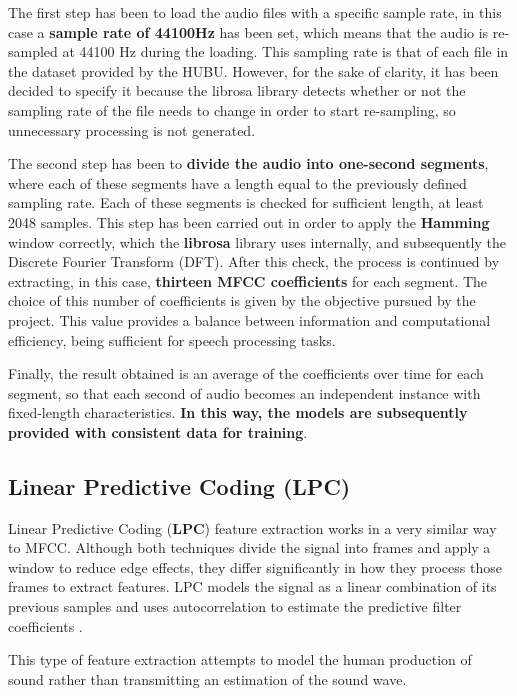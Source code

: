 The first step has been to load the audio files with a specific sample rate, in this case a \textbf{sample rate of 44100Hz} has been set, which means that the audio is re-sampled at 44100 Hz during the loading. This sampling rate is that of each file in the dataset provided by the HUBU. However, for the sake of clarity, it has been decided to specify it because the librosa library detects whether or not the sampling rate of the file needs to change in order to start re-sampling, so unnecessary processing is not generated. 

The second step has been to \textbf{divide the audio into one-second segments}, where each of these segments have a length equal to the previously defined sampling rate. Each of these segments is checked for sufficient length, at least 2048 samples. This step has been carried out in order to apply the \textbf{Hamming} window correctly, which the \textbf{librosa} library uses internally, and subsequently the Discrete Fourier Transform (DFT).  After this check, the process is continued by extracting, in this case, \textbf{thirteen MFCC coefficients} for each segment. The choice of this number of coefficients is given by the objective pursued by the project. This value provides a balance between information and computational efficiency, being sufficient for speech processing tasks. 

Finally, the result obtained is an average of the coefficients over time for each segment, so that each second of audio becomes an independent instance with fixed-length characteristics. \textbf{In this way, the models are subsequently provided with consistent data for training}. 

\subsection{Linear Predictive Coding (LPC)}
Linear Predictive Coding (\textbf{LPC}) feature extraction works in a very similar way to MFCC. Although both techniques divide the signal into frames and apply a window to reduce edge effects, they differ significantly in how they process those frames to extract features. LPC models the signal as a linear combination of its previous samples and uses autocorrelation to estimate the predictive filter coefficients \cite{Bradbury2000}.

\begin{tcolorbox}
This type of feature extraction attempts to model the human production of sound rather than transmitting an estimation of the sound wave. 
\end{tcolorbox}

